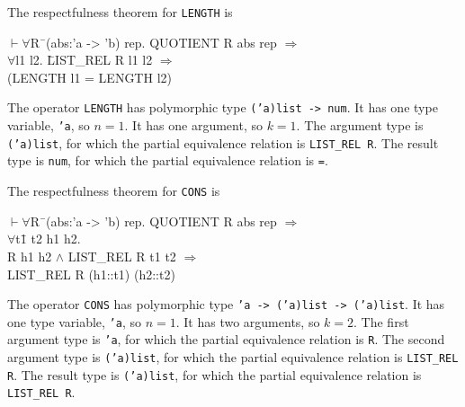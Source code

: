 \documentclass[envcountsame,runningheads]{llncs}
\newcommand{\quotient}{partial equivalence}
\begin{document}
\pagebreak[2]
The respectfulness theorem for {\tt LENGTH} is
{\tt \begin{tabbing}
\hspace{5.5mm}
    $\vdash \forall$R\=\ (abs:'a -> 'b) rep. QUOTIENT R abs rep $\Rightarrow$ \\
\>       $\forall$l1 l2. \=LIST\_REL R l1 l2 $\Rightarrow$ \\
\>\>             (LENGTH l1 = LENGTH l2)
\end{tabbing}}
The operator {\tt LENGTH} has polymorphic type {\tt ('a)list -> num}.
It has one type variable, {\tt 'a}, so $n = 1$.
It has one argument, so $k = 1$.
The argument type is
{\tt ('a)list},
for which
the \quotient{} relation
is {\tt LIST\_REL R}.
The result type is
{\tt num},
for which
the \quotient{} relation
is {\tt =}.

The respectfulness theorem for {\tt CONS} is
{\tt \begin{tabbing}
\hspace{5.5mm}
    $\vdash \forall$R\=\ (abs:'a -> 'b) rep. QUOTIENT R abs rep $\Rightarrow$ \\
\>       $\forall$t\=1 t2 h1 h2. \\
\>\>       R h1 h2 $\wedge$ LIST\_REL R t1 t2 $\Rightarrow$ \\
\>\>       LIST\_REL R (h1::t1) (h2::t2)
\end{tabbing}}
The operator {\tt CONS} has polymorphic type {\tt 'a -> ('a)list -> ('a)list}.
It has one type variable, {\tt 'a}, so $n = 1$.
It has two arguments, so $k = 2$.
The first argument type is
{\tt 'a},
for which
the \quotient{} relation
is {\tt R}.
The second argument type is
{\tt ('a)list},
for which
the \quotient{} relation
is {\tt LIST\_REL R}.
The result type is
{\tt ('a)list},
for which
the \quotient{} relation
is {\tt LIST\_REL R}.
\end{document}
